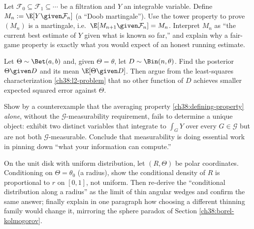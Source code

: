 \begin{exercise}
\label{ch38:ex-martingale}
Let $\mathcal{F}_0 \subseteq \mathcal{F}_1 \subseteq \cdots$ be a filtration and $Y$ an integrable
variable. Define $M_n := \E[Y\given\mathcal{F}_n]$ (a ``Doob martingale''). Use the tower property to
prove $(M_n)$ is a martingale, i.e.\ $\E[M_{n+1}\given\mathcal{F}_n] = M_n$. Interpret $M_n$ as ``the
current best estimate of $Y$ given what is known so far,'' and explain why a fair-game property is
exactly what you would expect of an honest running estimate.
\end{exercise}

\begin{exercise}
\label{ch38:ex-bayes}
Let $\Theta \sim \Bet(a,b)$ and, given $\Theta = \theta$, let $D \sim \Bin(n,\theta)$. Find the
posterior $\Theta \given D$ and its mean $\E[\Theta\given D]$. Then argue from the least-squares
characterization \eqref{ch38:l2-problem} that no other function of $D$ achieves smaller expected
squared error against $\Theta$.
\end{exercise}

\begin{exercise}
\label{ch38:ex-measurability}
Show by a counterexample that the averaging property \eqref{ch38:defining-property} \emph{alone},
without the $\mathcal{G}$-measurability requirement, fails to determine a unique object: exhibit two
distinct variables that integrate to $\int_G Y$ over every $G \in \mathcal{G}$ but are not both
$\mathcal{G}$-measurable. Conclude that measurability is doing essential work in pinning down ``what
your information can compute.''
\end{exercise}

\begin{exercise}
\label{ch38:ex-borel}
On the unit disk with uniform distribution, let $(R,\Theta)$ be polar coordinates. Conditioning on
$\Theta = \theta_0$ (a radius), show the conditional density of $R$ is proportional to $r$ on
$[0,1]$, not uniform. Then re-derive the ``conditional distribution along a radius'' as the limit of
thin angular wedges and confirm the same answer; finally explain in one paragraph how choosing a
different thinning family would change it, mirroring the sphere paradox of Section
\ref{ch38:borel-kolmogorov}.
\end{exercise}
